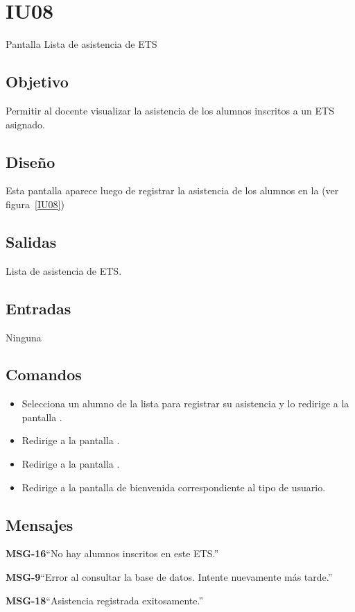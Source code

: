 \section{IU08}{Pantalla Lista de asistencia de ETS}

\subsection{Objetivo}
Permitir al docente visualizar la asistencia de los alumnos inscritos a un ETS asignado.

\subsection{Diseño}
Esta pantalla aparece luego de registrar la asistencia de los alumnos en la  (ver figura~\ref{IU08})


\subsection{Salidas}
Lista de asistencia de ETS.

\subsection{Entradas}
Ninguna

\subsection{Comandos}
\begin{itemize}
	\item {} Selecciona un alumno de la lista para registrar su asistencia y lo redirige a la pantalla .
	\item {} Redirige a la pantalla .
    \item {} Redirige a la pantalla .
    \item {} Redirige a la pantalla de bienvenida correspondiente al tipo de usuario.
\end{itemize}

\subsection{Mensajes}

\begin{Citemize}
	\item {\bf MSG-16}{``No hay alumnos inscritos en este ETS.''}
	\item {\bf MSG-9}{``Error al consultar la base de datos. Intente nuevamente más tarde.''}
	\item {\bf MSG-18}{``Asistencia registrada exitosamente.''}  
\end{Citemize}